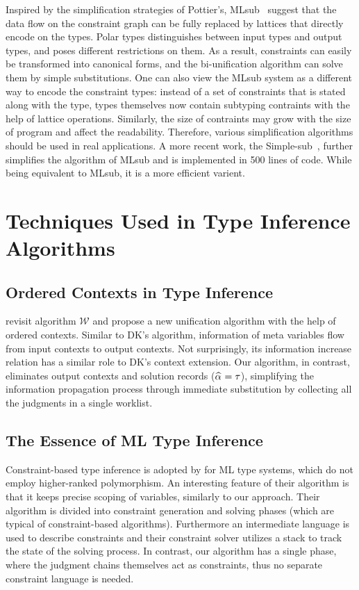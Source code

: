 Inspired by the simplification strategies of Pottier's,
MLsub~\citep{mlsub} suggest that the data flow on the constraint graph
can be fully replaced by lattices that directly encode on the types.
Polar types distinguishes between input types and output types,
and poses different restrictions on them.
As a result, constraints can easily be transformed into canonical forms,
and the bi-unification algorithm can solve them by simple substitutions.
One can also view the MLsub system as a different way to encode the constraint types:
instead of a set of constraints that is stated along with the type,
types themselves now contain subtyping contraints with the help of lattice operations.
Similarly, the size of contraints may grow with the size of program
and affect the readability.
Therefore, various simplification algorithms should be used in real applications.
A more recent work, the Simple-sub~\citep{Parreaux2020simple}, further simplifies
the algorithm of MLsub and is implemented in 500 lines of code.
While being equivalent to MLsub, it is a more efficient varient.

\section{Techniques Used in Type Inference Algorithms}

\subsection{Ordered Contexts in Type Inference}
\citet{gundry2010type} revisit algorithm $\mathcal{W}$ and
propose a new unification algorithm with the help of ordered contexts.
Similar to DK's algorithm, information of meta variables flow from input contexts to output contexts.
Not surprisingly, its information increase relation has a similar role to DK's context extension.
Our algorithm, in contrast,
eliminates output contexts and solution records ($\al = \tau$),
simplifying the information propagation process through immediate substitution
by collecting all the judgments in a single worklist.

\subsection{The Essence of ML Type Inference}
Constraint-based type inference is adopted by \citet{remy-attapl} for
ML type systems, which do not employ higher-ranked polymorphism. An
interesting feature of their algorithm is that it keeps precise
scoping of variables, similarly to our approach.  Their algorithm is
divided into constraint generation and solving phases (which are
typical of constraint-based algorithms). Furthermore an intermediate
language is used to describe constraints and their constraint solver
utilizes a stack to track the state of the solving process.  In
contrast, our algorithm has a single phase, where the judgment chains
themselves act as constraints, thus no separate constraint language is
needed.

